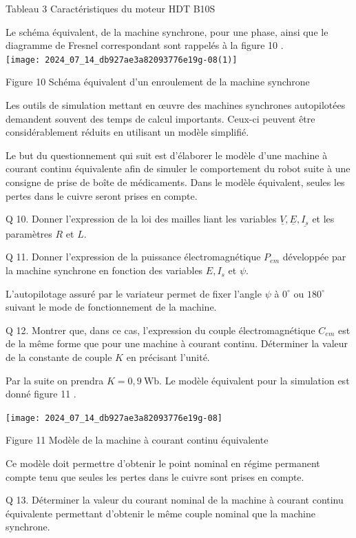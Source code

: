 \documentclass[10pt]{article}
\begin{document}
Tableau 3 Caractéristiques du moteur HDT B10S

Le schéma équivalent, de la machine synchrone, pour une phase, ainsi que le diagramme de Fresnel correspondant sont rappelés à la figure 10 .\\
\texttt{[image: 2024\_07\_14\_db927ae3a82093776e19g-08(1)]}

Figure 10 Schéma équivalent d'un enroulement de la machine synchrone

Les outils de simulation mettant en œuvre des machines synchrones autopilotées demandent souvent des temps de calcul importants. Ceux-ci peuvent être considérablement réduits en utilisant un modèle simplifié.

Le but du questionnement qui suit est d'élaborer le modèle d'une machine à courant continu équivalente afin de simuler le comportement du robot suite à une consigne de prise de boîte de médicaments. Dans le modèle équivalent, seules les pertes dans le cuivre seront prises en compte.

Q 10. Donner l'expression de la loi des mailles liant les variables $\underline{V}, \underline{E}, \underline{I_{s}}$ et les paramètres $R$ et $L$.

Q 11. Donner l'expression de la puissance électromagnétique $P_{e m}$ développée par la machine synchrone en fonction des variables $E, I_{s}$ et $\psi$.

L'autopilotage assuré par le variateur permet de fixer l'angle $\psi$ à $0^{\circ}$ ou $180^{\circ}$ suivant le mode de fonctionnement de la machine.

Q 12. Montrer que, dans ce cas, l'expression du couple électromagnétique $C_{e m}$ est de la même forme que pour une machine à courant continu. Déterminer la valeur de la constante de couple $K$ en précisant l'unité.

Par la suite on prendra $K=0,9 \mathrm{~Wb}$. Le modèle équivalent pour la simulation est donné figure 11 .

\begin{center}
\texttt{[image: 2024\_07\_14\_db927ae3a82093776e19g-08]}
\end{center}

Figure 11 Modèle de la machine à courant continu équivalente

Ce modèle doit permettre d'obtenir le point nominal en régime permanent compte tenu que seules les pertes dans le cuivre sont prises en compte.

Q 13. Déterminer la valeur du courant nominal de la machine à courant continu équivalente permettant d'obtenir le même couple nominal que la machine synchrone.
\end{document}
